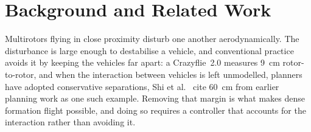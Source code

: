 %
%
%
%
%
%

\chapter{Background and Related Work}
\label{ch:related}

Multirotors flying in close proximity disturb one another aerodynamically. The disturbance is
large enough to destabilise a vehicle, and conventional practice avoids it by keeping the vehicles
far apart: a Crazyflie~2.0 measures \SI{9}{\centi\metre} rotor-to-rotor, and when the interaction
between vehicles is left unmodelled, planners have adopted conservative separations, Shi et
al.~\cite{shi2020neuralswarm} cite \SI{60}{\centi\metre} from earlier planning work as one such
example. Removing that margin is what makes dense
formation flight possible, and doing so requires a controller that accounts for the interaction
rather than avoiding it.

